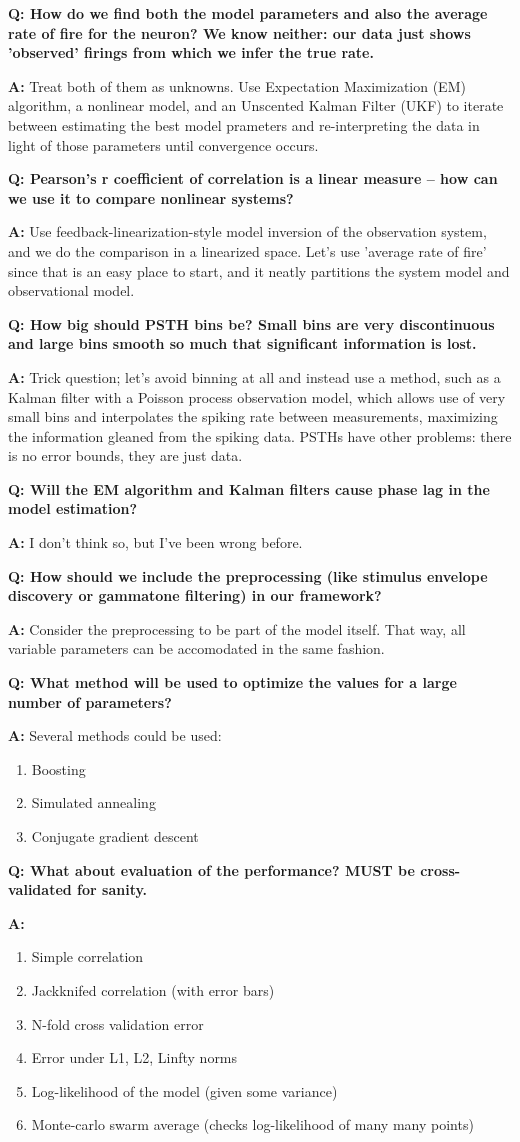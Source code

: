 \documentclass{article}
\newenvironment{qanda}{\setlength{\parindent}{0pt}}{\bigskip}
\newcommand{\Q}{\bigskip\bfseries Q: }
\newcommand{\A}{\par\textbf{A:} \normalfont}
\begin{document}
\begin{qanda}

\Q How do we find both the model parameters and also the average rate of fire for the neuron? We know neither: our data just shows 'observed' firings from which we infer the true rate.
\A Treat both of them as unknowns. Use Expectation Maximization (EM) algorithm, a nonlinear model, and an Unscented Kalman Filter (UKF) to iterate between estimating the best model prameters and re-interpreting the data in light of those parameters until convergence occurs. %

\Q Pearson's r coefficient of correlation is a linear measure -- how can we use it to compare nonlinear systems?
\A Use feedback-linearization-style model inversion of the observation system, and we do the comparison in a linearized space. Let's use 'average rate of fire' since that is an easy place to start, and it neatly partitions the system model and observational model.

\Q How big should PSTH bins be? Small bins are very discontinuous and large bins smooth so much that significant information is lost. 
\A Trick question; let's avoid binning at all and instead use a method, such as a Kalman filter with a Poisson process observation model, which allows use of very small bins and interpolates the spiking rate between measurements, maximizing the information gleaned from the spiking data. PSTHs have other problems: there is no error bounds, they are just data. 

\Q Will the EM algorithm and Kalman filters cause phase lag in the model estimation?
\A I don't think so, but I've been wrong before.

\Q How should we include the preprocessing (like stimulus envelope discovery or gammatone filtering) in our framework?
\A Consider the preprocessing to be part of the model itself. That way, all variable parameters can be accomodated in the same fashion.

\Q What method will be used to optimize the values for a large number of parameters?
\A Several methods could be used: \begin{enumerate}
  \item Boosting
  \item Simulated annealing
  \item Conjugate gradient descent
\end{enumerate}

\Q What about evaluation of the performance? MUST be cross-validated for sanity.
\A \begin{enumerate}
  \item Simple correlation
  \item Jackknifed correlation (with error bars)
  \item N-fold cross validation error
  \item Error under L1, L2, Linfty norms
  \item Log-likelihood of the model (given some variance)
  \item Monte-carlo swarm average (checks log-likelihood of many many points)
\end{enumerate} 


\end{qanda}
\end{document}
